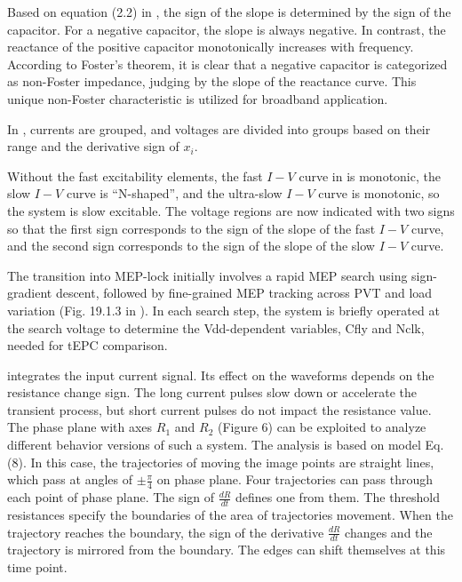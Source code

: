 \documentclass[11pt]{book}
\begin{document}
Based on equation (2.2) in \cite{long2015non}, the sign of the slope
is determined by the sign of the capacitor. For a negative capacitor,
the slope is always negative. In contrast, the reactance of the positive
capacitor monotonically increases with frequency. According to Foster's
theorem, it is clear that a negative capacitor is categorized as non-Foster
impedance, judging by the slope of the reactance curve. This unique
non-Foster characteristic is utilized for broadband application.

In \cite{aridhi2015fast}, currents are grouped, and voltages are
divided into groups based on their range and the derivative sign of
$x_{i}$.

Without the fast excitability elements, the fast $I-V$ curve in \cite{ribar2019neuromodulation}
is monotonic, the slow $I-V$ curve is ``N-shaped'', and the ultra-slow
$I-V$ curve is monotonic, so the system is slow excitable. The voltage
regions are now indicated with two signs so that the first sign corresponds
to the sign of the slope of the fast $I-V$ curve, and the second
sign corresponds to the sign of the slope of the slow $I-V$ curve.

The transition into MEP-lock initially involves a rapid MEP search
using sign-gradient descent, followed by fine-grained MEP tracking
across PVT and load variation (Fig. 19.1.3 in \cite{ur201919}). In
each search step, the system is briefly operated at the search voltage
to determine the Vdd-dependent variables, Cfly and Nclk, needed for
tEPC comparison.

\cite{rakitin2021functional} integrates the input current signal.
Its effect on the waveforms depends on the resistance change sign.
The long current pulses slow down or accelerate the transient process,
but short current pulses do not impact the resistance value. The phase
plane with axes $R_{1}$ and $R_{2}$ (Figure 6) can be exploited
to analyze different behavior versions of such a system. The analysis
is based on model Eq. (8). In this case, the trajectories of moving
the image points are straight lines, which pass at angles of $\pm\frac{\pi}{4}$
on phase plane. Four trajectories can pass through each point of phase
plane. The sign of $\frac{dR}{dt}$ defines one from them. The threshold
resistances specify the boundaries of the area of trajectories movement.
When the trajectory reaches the boundary, the sign of the derivative
$\frac{dR}{dt}$ changes and the trajectory is mirrored from the boundary.
The edges can shift themselves at this time point.
\end{document}
